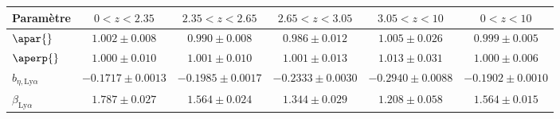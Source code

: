 \begin{table}[h]
\begin{tabular}{lccccc}
\toprule
Param\`etre  & $\num{0} < z < \num{2.35}$ & $\num{2.35} < z < \num{2.65}$ & $\num{2.65} < z < \num{3.05}$ & $\num{3.05} < z < \num{10}$  & $\num{0} < z < \num{10}$ \\
\midrule
$\apar{} $ & $ 1.002 \pm 0.008$ & $ 0.990 \pm 0.008$ & $ 0.986 \pm 0.012$ & $ 1.005 \pm 0.026$ & $ 0.999 \pm 0.005$ \\
$\aperp{} $ & $ 1.000 \pm 0.010$ & $ 1.001 \pm 0.010$ & $ 1.001 \pm 0.013$ & $ 1.013 \pm 0.031$ & $ 1.000 \pm 0.006$ \\
$b_{\eta, \mathrm{Ly}\alpha} $ & $ -0.1717 \pm 0.0013$ & $ -0.1985 \pm 0.0017$ & $ -0.2333 \pm 0.0030$ & $ -0.2940 \pm 0.0088$ & $ -0.1902 \pm 0.0010$ \\
$\beta_{\mathrm{Ly}\alpha} $ & $ 1.787 \pm 0.027$ & $ 1.564 \pm 0.024$ & $ 1.344 \pm 0.029$ & $ 1.208 \pm 0.058$ & $ 1.564 \pm 0.015$ \\

\end{tabular}
\end{table}
